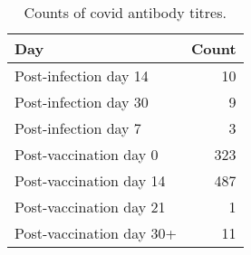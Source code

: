 \begin{table}

\caption{\label{tab:bleed-counts-covid}Counts of covid antibody titres.}
\centering
\begin{tabular}[t]{lr}
\toprule
Day & Count\\
\midrule
Post-infection day 14 & 10\\
Post-infection day 30 & 9\\
Post-infection day 7 & 3\\
\addlinespace
Post-vaccination day 0 & 323\\
Post-vaccination day 14 & 487\\
Post-vaccination day 21 & 1\\
Post-vaccination day 30+ & 11\\
\bottomrule
\end{tabular}
\end{table}
